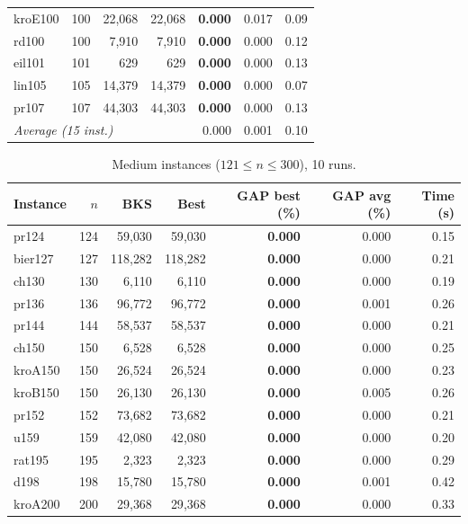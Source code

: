 \documentclass[runningheads]{llncs}
\begin{document}
\begin{table}
\begin{tabular}{@{}lrrrrrr@{}}
kroE100 & 100 & 22{,}068 & 22{,}068 & \textbf{0.000} & 0.017 & 0.09 \\
rd100 & 100 & 7{,}910 & 7{,}910 & \textbf{0.000} & 0.000 & 0.12 \\
eil101 & 101 & 629 & 629 & \textbf{0.000} & 0.000 & 0.13 \\
lin105 & 105 & 14{,}379 & 14{,}379 & \textbf{0.000} & 0.000 & 0.07 \\
pr107 & 107 & 44{,}303 & 44{,}303 & \textbf{0.000} & 0.000 & 0.13 \\
\midrule
\multicolumn{4}{l}{\textit{Average (15 inst.)}} & 0.000 & 0.001 & 0.10 \\
\bottomrule
\end{tabular}
\end{table}

\begin{table}
\caption{Medium instances ($121\le n\le 300$), 10 runs.}
\label{tab:medium}
\centering\scriptsize
\begin{tabular}{@{}lrrrrrr@{}}
\toprule
\textbf{Instance} & $n$ & \textbf{BKS} & \textbf{Best} & \textbf{GAP best (\%)} & \textbf{GAP avg (\%)} & \textbf{Time (s)}\\
\midrule
pr124 & 124 & 59{,}030 & 59{,}030 & \textbf{0.000} & 0.000 & 0.15 \\
bier127 & 127 & 118{,}282 & 118{,}282 & \textbf{0.000} & 0.000 & 0.21 \\
ch130 & 130 & 6{,}110 & 6{,}110 & \textbf{0.000} & 0.000 & 0.19 \\
pr136 & 136 & 96{,}772 & 96{,}772 & \textbf{0.000} & 0.001 & 0.26 \\
pr144 & 144 & 58{,}537 & 58{,}537 & \textbf{0.000} & 0.000 & 0.21 \\
ch150 & 150 & 6{,}528 & 6{,}528 & \textbf{0.000} & 0.000 & 0.25 \\
kroA150 & 150 & 26{,}524 & 26{,}524 & \textbf{0.000} & 0.000 & 0.23 \\
kroB150 & 150 & 26{,}130 & 26{,}130 & \textbf{0.000} & 0.005 & 0.26 \\
pr152 & 152 & 73{,}682 & 73{,}682 & \textbf{0.000} & 0.000 & 0.21 \\
u159 & 159 & 42{,}080 & 42{,}080 & \textbf{0.000} & 0.000 & 0.20 \\
rat195 & 195 & 2{,}323 & 2{,}323 & \textbf{0.000} & 0.000 & 0.29 \\
d198 & 198 & 15{,}780 & 15{,}780 & \textbf{0.000} & 0.001 & 0.42 \\
kroA200 & 200 & 29{,}368 & 29{,}368 & \textbf{0.000} & 0.000 & 0.33 \\

\end{tabular}
\end{table}
\end{document}
